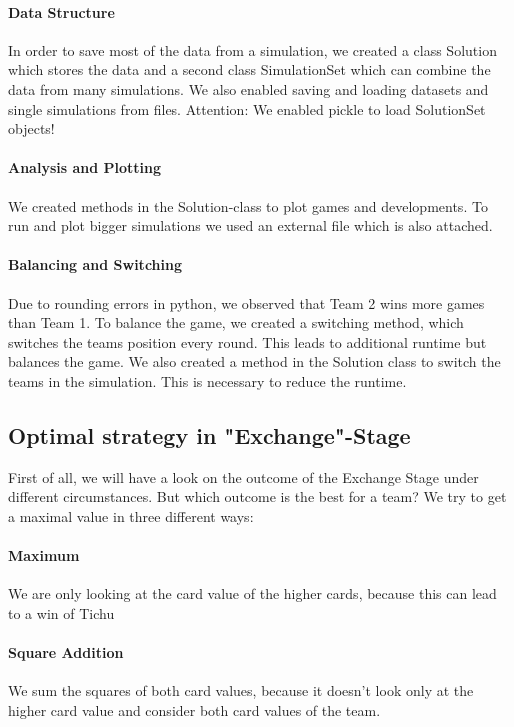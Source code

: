 \paragraph{Data Structure}
In order to save most of the data from a simulation, we created a class Solution which stores the data and a second class SimulationSet which can combine the data from many simulations. We also enabled saving and loading datasets and single simulations from files. Attention: We enabled pickle to load SolutionSet objects!  

\paragraph{Analysis and Plotting}
We created methods in the Solution-class to plot games and developments. To run and plot bigger simulations we used an external file which is also attached. 

\paragraph{Balancing and Switching}
Due to rounding errors in python, we observed that Team 2 wins more games than Team 1. 
To balance the game, we created a switching method, which switches the teams position every round. This leads to additional runtime but balances the game. 
We also created a method in the Solution class to switch the teams in the simulation. This is necessary to reduce the runtime. 

\subsection{Optimal strategy in "Exchange"-Stage}

First of all, we will have a look on the outcome of the Exchange Stage under different circumstances. But which outcome is the best for a team? We try to get a maximal value in three different ways:

\paragraph{Maximum}  We are only looking at the card value of the higher cards, because this can lead to a win of Tichu
\paragraph{Square Addition}  We sum the squares of both card values, because it doesn’t look only at the higher card value and consider both card values of the team.
